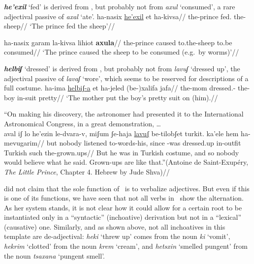 \textbf{\emph{he'exil}} `fed' is derived from , but probably not from \emph{axul} `consumed', a rare adjectival passive of \emph{axal} `ate'.
\pex
	\a \begingl
		\gla ha-nasix \underline{he'exil} et ha-kivsa//
		\glb the-prince fed.  the-sheep//
		\glft `The prince fed the sheep'//
		\endgl
		
	\a \ljudge{$\ne$} \begingl
		\gla ha-nasix garam la-kivsa lihiot \textbf{axula}//
		\glb the-prince caused to.the-sheep to.be consumed//
		\glft `The prince caused the sheep to be consumed (e.g.~by worms)'//
		\endgl
\xe

\textbf{\emph{helbiʃ}} `dressed' is derived from , but probably not from \emph{lavuʃ} `dressed up', the adjectival passive of \emph{lavaʃ} `wore', which seems to be reserved for descriptions of a full costume.
\pex
	\a \begingl
		\gla ha-ima \underline{helbiʃ-a} et ha-jeled (be-)xalifa jafa//
		\glb the-mom dressed.-  the-boy in-suit pretty//
		\glft `The mother put the boy's pretty suit on (him).//
		\endgl
	
	\a ``On making his discovery, the astronomer had presented it to the International Astronomical Congress, in a great demonstration, \dots\\
	\begingl
		\gla aval iʃ lo he'ezin le-dvara-v, miʃum ʃe-haja \underline{lavuʃ} be-tilobʃet turkit. ka'ele hem ha-mevugarim//
		\glb but nobody  listened to-words-his, since -was dressed.up in-outfit Turkish such  the-grown.ups//
		\glft But he was in Turkish costume, and so nobody would believe what he said. Grown-ups are like that.''\hfill {(Antoine de Saint-Exup\'ery, \emph{The Little Prince}, Chapter 4. Hebrew by Jude Shva\footnotemark)}//
	\endgl
{}
\xe

\cite{borer91} did not claim that the sole function of \thif~is to verbalize adjectives. But even if this is one of its functions, we have seen that not all verbs in \thif~show the alternation. As her system stands, it is not clear how it could allow for a certain root to be instantiated only in a ``syntactic'' (inchoative) derivation but not in a ``lexical'' (causative) one. Similarly, and as shown above, not all inchoatives in this template are de-adjectival: \emph{heki} `threw up' comes from the noun \emph{ki} `vomit', \emph{hekrim} `clotted' from the noun \emph{krem} `cream', and \emph{hetsxin} `smelled pungent' from the noun \emph{tsaxana} `pungent smell'.

